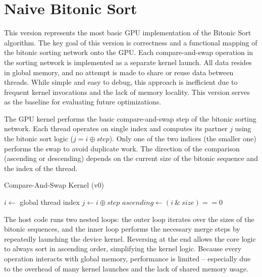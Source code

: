 \documentclass{article}
\begin{document}
\section{Naive Bitonic Sort}

This version represents the most basic GPU implementation of the Bitonic Sort algorithm. The key goal of this 
version is correctness and a functional mapping of the bitonic sorting network onto the GPU. Each 
compare-and-swap operation in the sorting network is implemented as a separate kernel launch. All data resides 
in global memory, and no attempt is made to share or reuse data between threads. While simple and easy to debug, 
this approach is inefficient due to frequent kernel invocations and the lack of memory locality. This version 
serves as the baseline for evaluating future optimizations.

The GPU kernel performs the basic compare-and-swap step of the bitonic sorting network. Each thread operates on 
single index and computes its partner $j$ using the bitonic sort logic ($j = i \oplus step$). Only one of the two 
indices (the smaller one) performs the swap to avoid duplicate work. The direction of the comparison (ascending or
descending) depends on the current size of the bitonic sequence and the index of the thread.

\begin{algorithm}[H]
\caption{Compare-And-Swap Kernel (v0)}
\begin{algorithmic}[1]
    \State $i \gets$ global thread index
     \Return \EndIf
    \State $j \gets i \oplus step$
        \State $ascending \gets (i \ \&\ size) == 0$
        \State {}
    \EndIf
\EndProcedure
\end{algorithmic}
\end{algorithm}

The host code runs two nested loops: the outer loop iterates over the sizes of the bitonic sequences, and the 
inner loop performs the necessary merge steps by repeatedly launching the device kernel. Reversing at the end 
allows the core logic to always sort in ascending order, simplifying the kernel logic. Because every operation 
interacts with global memory, performance is limited -- especially due to the overhead of many kernel launches 
and the lack of shared memory usage.
\end{document}
